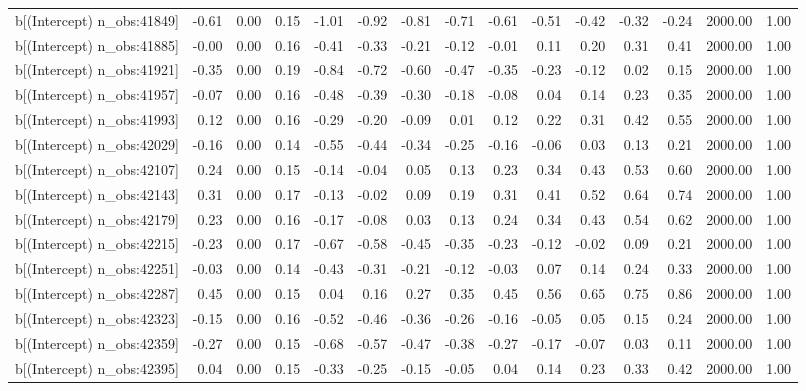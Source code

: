 \begin{table}[ht]
\begin{tabular}{rrrrrrrrrrrrrrr}
  b[(Intercept) n\_obs:41849] & -0.61 & 0.00 & 0.15 & -1.01 & -0.92 & -0.81 & -0.71 & -0.61 & -0.51 & -0.42 & -0.32 & -0.24 & 2000.00 & 1.00 \\ 
  b[(Intercept) n\_obs:41885] & -0.00 & 0.00 & 0.16 & -0.41 & -0.33 & -0.21 & -0.12 & -0.01 & 0.11 & 0.20 & 0.31 & 0.41 & 2000.00 & 1.00 \\ 
  b[(Intercept) n\_obs:41921] & -0.35 & 0.00 & 0.19 & -0.84 & -0.72 & -0.60 & -0.47 & -0.35 & -0.23 & -0.12 & 0.02 & 0.15 & 2000.00 & 1.00 \\ 
  b[(Intercept) n\_obs:41957] & -0.07 & 0.00 & 0.16 & -0.48 & -0.39 & -0.30 & -0.18 & -0.08 & 0.04 & 0.14 & 0.23 & 0.35 & 2000.00 & 1.00 \\ 
  b[(Intercept) n\_obs:41993] & 0.12 & 0.00 & 0.16 & -0.29 & -0.20 & -0.09 & 0.01 & 0.12 & 0.22 & 0.31 & 0.42 & 0.55 & 2000.00 & 1.00 \\ 
  b[(Intercept) n\_obs:42029] & -0.16 & 0.00 & 0.14 & -0.55 & -0.44 & -0.34 & -0.25 & -0.16 & -0.06 & 0.03 & 0.13 & 0.21 & 2000.00 & 1.00 \\ 
  b[(Intercept) n\_obs:42107] & 0.24 & 0.00 & 0.15 & -0.14 & -0.04 & 0.05 & 0.13 & 0.23 & 0.34 & 0.43 & 0.53 & 0.60 & 2000.00 & 1.00 \\ 
  b[(Intercept) n\_obs:42143] & 0.31 & 0.00 & 0.17 & -0.13 & -0.02 & 0.09 & 0.19 & 0.31 & 0.41 & 0.52 & 0.64 & 0.74 & 2000.00 & 1.00 \\ 
  b[(Intercept) n\_obs:42179] & 0.23 & 0.00 & 0.16 & -0.17 & -0.08 & 0.03 & 0.13 & 0.24 & 0.34 & 0.43 & 0.54 & 0.62 & 2000.00 & 1.00 \\ 
  b[(Intercept) n\_obs:42215] & -0.23 & 0.00 & 0.17 & -0.67 & -0.58 & -0.45 & -0.35 & -0.23 & -0.12 & -0.02 & 0.09 & 0.21 & 2000.00 & 1.00 \\ 
  b[(Intercept) n\_obs:42251] & -0.03 & 0.00 & 0.14 & -0.43 & -0.31 & -0.21 & -0.12 & -0.03 & 0.07 & 0.14 & 0.24 & 0.33 & 2000.00 & 1.00 \\ 
  b[(Intercept) n\_obs:42287] & 0.45 & 0.00 & 0.15 & 0.04 & 0.16 & 0.27 & 0.35 & 0.45 & 0.56 & 0.65 & 0.75 & 0.86 & 2000.00 & 1.00 \\ 
  b[(Intercept) n\_obs:42323] & -0.15 & 0.00 & 0.16 & -0.52 & -0.46 & -0.36 & -0.26 & -0.16 & -0.05 & 0.05 & 0.15 & 0.24 & 2000.00 & 1.00 \\ 
  b[(Intercept) n\_obs:42359] & -0.27 & 0.00 & 0.15 & -0.68 & -0.57 & -0.47 & -0.38 & -0.27 & -0.17 & -0.07 & 0.03 & 0.11 & 2000.00 & 1.00 \\ 
  b[(Intercept) n\_obs:42395] & 0.04 & 0.00 & 0.15 & -0.33 & -0.25 & -0.15 & -0.05 & 0.04 & 0.14 & 0.23 & 0.33 & 0.42 & 2000.00 & 1.00 \\ 

\end{tabular}
\end{table}
